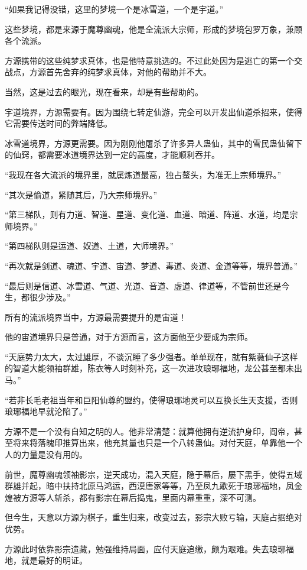 \begin{this_body}
“如果我记得没错，这里的梦境一个是冰雪道，一个是宇道。”

这些梦境，都是来源于魔尊幽魂，他是全流派大宗师，形成的梦境包罗万象，兼顾各个流派。

方源携带的这些纯梦求真体，也是他特意挑选的。不过此处因为是逃亡的第一个交战点，方源首先舍弃的纯梦求真体，对他的帮助并不大。

当然，这是过去的眼光，现在看来，却是有些帮助的。

宇道境界，方源需要有。因为围绕七转定仙游，完全可以开发出仙道杀招来，使得它需要传送时间的弊端降低。

冰雪道境界，方源更需要。因为刚刚他屠杀了许多异人蛊仙，其中的雪民蛊仙留下的仙窍，都需要冰道境界达到一定的高度，才能顺利吞并。

“我现在各大流派的境界里，就属炼道最高，独占鳌头，为准无上宗师境界。”

“其次是偷道，紧随其后，乃大宗师境界。”

“第三梯队，则有力道、智道、星道、变化道、血道、暗道、阵道、水道，均是宗师境界。”

“第四梯队则是运道、奴道、土道，大师境界。”

“再次就是剑道、魂道、宇道、宙道、梦道、毒道、炎道、金道等等，境界普通。”

“最后则是信道、冰雪道、气道、光道、音道、虚道、律道等，不管前世还是今生，都很少涉及。”

所有的流派境界当中，方源最需要提升的是宙道！

他的宙道境界只是普通，对于方源而言，这方面他至少要成为宗师。

“天庭势力太大，太过雄厚，不谈沉睡了多少强者。单单现在，就有紫薇仙子这样的智道大能领袖群雄，陈衣等人时刻补充，这一次进攻琅琊福地，龙公甚至都未出马。”

“若非长毛老祖当年和巨阳仙尊的盟约，使得琅琊地灵可以互换长生天支援，否则琅琊福地早就沦陷了。”

方源不是一个没有自知之明的人。他非常清楚：就算他拥有逆流护身印，阎帝，甚至将来将落魄印推算出来，他充其量也只是一个八转蛊仙。对付天庭，单靠他一个人的力量是没有用的。

前世，魔尊幽魂领袖影宗，逆天成功，混入天庭，隐于幕后，屡下黑手，使得五域群雄并起，暗中扶持北原马鸿运，西漠唐家等等，乃至凤九歌死于琅琊福地，凤金煌被方源等人斩杀，都有影宗在幕后捣鬼，里面内幕重重，深不可测。

但今生，天意以方源为棋子，重生归来，改变过去，影宗大败亏输，天庭占据绝对优势。

方源此时依靠影宗遗藏，勉强维持局面，应付天庭追缴，颇为艰难。失去琅琊福地，就是最好的明证。


\end{this_body}
